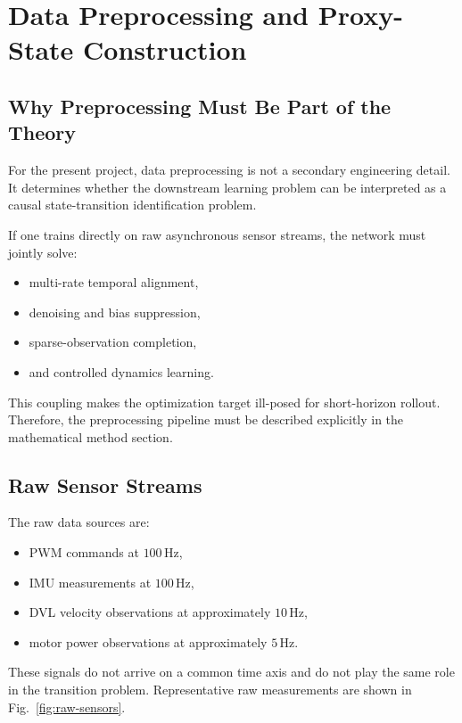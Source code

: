 \section{Data Preprocessing and Proxy-State Construction}

\subsection{Why Preprocessing Must Be Part of the Theory}

For the present project, data preprocessing is not a secondary engineering detail.
It determines whether the downstream learning problem can be interpreted as a causal state-transition identification problem.

If one trains directly on raw asynchronous sensor streams, the network must jointly solve:
\begin{itemize}
  \item multi-rate temporal alignment,
  \item denoising and bias suppression,
  \item sparse-observation completion,
  \item and controlled dynamics learning.
\end{itemize}

This coupling makes the optimization target ill-posed for short-horizon rollout.
Therefore, the preprocessing pipeline must be described explicitly in the mathematical method section.

\subsection{Raw Sensor Streams}

The raw data sources are:
\begin{itemize}
  \item PWM commands at $100\,\mathrm{Hz}$,
  \item IMU measurements at $100\,\mathrm{Hz}$,
  \item DVL velocity observations at approximately $10\,\mathrm{Hz}$,
  \item motor power observations at approximately $5\,\mathrm{Hz}$.
\end{itemize}

These signals do not arrive on a common time axis and do not play the same role in the transition problem.
Representative raw measurements are shown in Fig.~\ref{fig:raw-sensors}.

